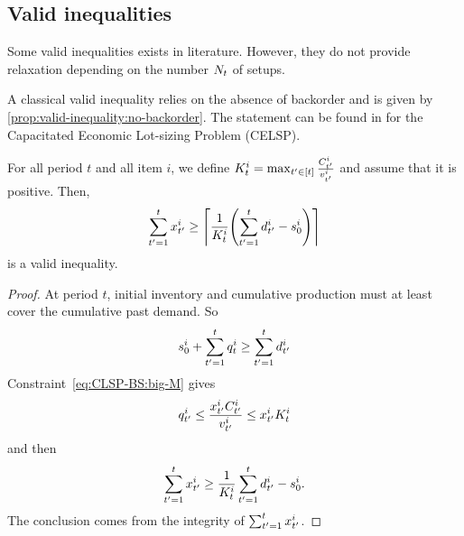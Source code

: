 



\subsection{Valid inequalities}
\label{sec:PDP:deterministic:theoretical-results:valid-inequality}

Some valid inequalities exists in literature. However, they do not provide relaxation depending on the number $N_t$ of setups.

A classical valid inequality relies on the absence of backorder and is given by \cref{prop:valid-inequality:no-backorder}. The statement can be found in \cite{Geunes2014} for the Capacitated Economic Lot-sizing Problem (CELSP).
\begin{prop}\label{prop:valid-inequality:no-backorder}
  For all period $t$ and all item $i$, we define $K_t^i = \max_{t'\in\range{t}}\frac{\capacity_{t'}^i}{\rate_{t'}^i}$ and assume that it is positive.
  Then,
  \begin{equation}\label{eq:valid-inequality:no-backorder}
    \sum_{t'=1}^{t}\setup_{t'}^i
    \ge
    \left\lceil
    \frac{1}{K_t^i} \bracket{ \sum_{t'=1}^{t}\demand_{t'}^i-\inventory_0^i }
    \right\rceil
  \end{equation}
  is a valid inequality.
\end{prop}


\begin{proof}
  At period $t$, initial inventory and cumulative production must at least cover the cumulative past demand. So
  \begin{equation}
    s_0^i + \sum_{t'=1}^{t} q_t^i \ge \sum_{t'=1}^{t}d_{t'}^i
  \end{equation}
  Constraint~\eqref{eq:CLSP-BS:big-M} gives
  \begin{equation}
    q_{t'}^i \le \frac{x_{t'}^iC_{t'}^i}{v_{t'}^i} \le x_{t'}^i K_t^i
  \end{equation}
  and then
  \begin{equation}
    \sum_{t'=1}^tx_{t'}^i \ge \frac{1}{K_t^i}\sum_{t'=1}^td_{t'}^i-s_0^i.
  \end{equation}
  The conclusion comes from the integrity of $\sum_{t'=1}^tx_{t'}^i$.
\end{proof}

